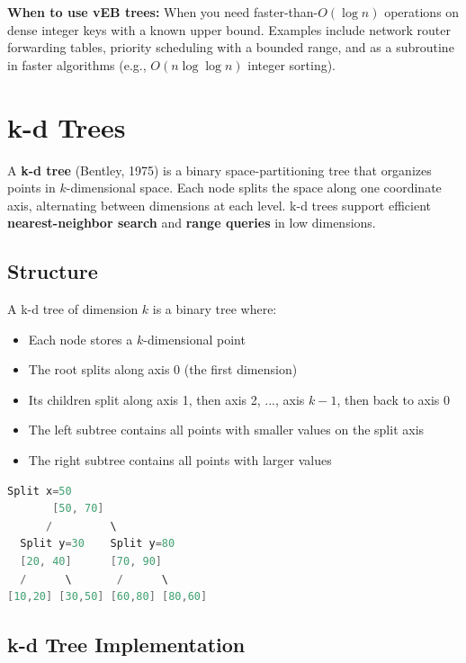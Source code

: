 \textbf{When to use vEB trees:} When you need faster-than-$O(\log n)$ operations on dense integer keys with a known upper bound. Examples include network router forwarding tables, priority scheduling with a bounded range, and as a subroutine in faster algorithms (e.g., $O(n \log \log n)$ integer sorting).

\section{k-d Trees}

A \textbf{k-d tree} (Bentley, 1975) is a binary space-partitioning tree that organizes points in $k$-dimensional space. Each node splits the space along one coordinate axis, alternating between dimensions at each level. k-d trees support efficient \textbf{nearest-neighbor search} and \textbf{range queries} in low dimensions.

\subsection{Structure}

A k-d tree of dimension $k$ is a binary tree where:
\begin{itemize}
\item Each node stores a $k$-dimensional point
\item The root splits along axis 0 (the first dimension)
\item Its children split along axis 1, then axis 2, ..., axis $k{-}1$, then back to axis 0
\item The left subtree contains all points with smaller values on the split axis
\item The right subtree contains all points with larger values
\end{itemize}

\begin{lstlisting}[language=Java]
  Split x=50
       [50, 70]
      /         \
  Split y=30    Split y=80
  [20, 40]      [70, 90]
  /      \       /      \
[10,20] [30,50] [60,80] [80,60]

\end{lstlisting}

\subsection{k-d Tree Implementation}

